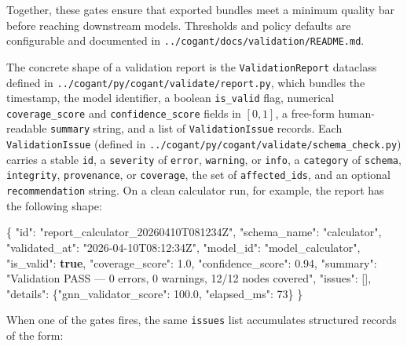 \documentclass[
]{article}
\newenvironment{Shaded}{}{}
\newcommand{\DataTypeTok}[1]{\textcolor[rgb]{0.56,0.13,0.00}{#1}}
\newcommand{\DecValTok}[1]{\textcolor[rgb]{0.25,0.63,0.44}{#1}}
\newcommand{\FloatTok}[1]{\textcolor[rgb]{0.25,0.63,0.44}{#1}}
\newcommand{\FunctionTok}[1]{\textcolor[rgb]{0.02,0.16,0.49}{#1}}
\newcommand{\KeywordTok}[1]{\textcolor[rgb]{0.00,0.44,0.13}{\textbf{#1}}}
\newcommand{\OtherTok}[1]{\textcolor[rgb]{0.00,0.44,0.13}{#1}}
\newcommand{\StringTok}[1]{\textcolor[rgb]{0.25,0.44,0.63}{#1}}
\begin{document}
Together, these gates ensure that exported bundles meet a minimum
quality bar before reaching downstream models. Thresholds and policy
defaults are configurable and documented in
\texttt{../cogant/docs/validation/README.md}.

The concrete shape of a validation report is the
\texttt{ValidationReport} dataclass defined in
\texttt{../cogant/py/cogant/validate/report.py}, which bundles the
timestamp, the model identifier, a boolean \texttt{is\_valid} flag,
numerical \texttt{coverage\_score} and \texttt{confidence\_score} fields
in \([0, 1]\), a free-form human-readable \texttt{summary} string, and a
list of \texttt{ValidationIssue} records. Each \texttt{ValidationIssue}
(defined in \texttt{../cogant/py/cogant/validate/schema\_check.py})
carries a stable \texttt{id}, a \texttt{severity} of \texttt{error},
\texttt{warning}, or \texttt{info}, a \texttt{category} of
\texttt{schema}, \texttt{integrity}, \texttt{provenance}, or
\texttt{coverage}, the set of \texttt{affected\_ids}, and an optional
\texttt{recommendation} string. On a clean calculator run, for example,
the report has the following shape:

\begin{Shaded}
\begin{Highlighting}[]
\FunctionTok{\{}
  \DataTypeTok{"id"}\FunctionTok{:} \StringTok{"report\_calculator\_20260410T081234Z"}\FunctionTok{,}
  \DataTypeTok{"schema\_name"}\FunctionTok{:} \StringTok{"calculator"}\FunctionTok{,}
  \DataTypeTok{"validated\_at"}\FunctionTok{:} \StringTok{"2026{-}04{-}10T08:12:34Z"}\FunctionTok{,}
  \DataTypeTok{"model\_id"}\FunctionTok{:} \StringTok{"model\_calculator"}\FunctionTok{,}
  \DataTypeTok{"is\_valid"}\FunctionTok{:} \KeywordTok{true}\FunctionTok{,}
  \DataTypeTok{"coverage\_score"}\FunctionTok{:} \FloatTok{1.0}\FunctionTok{,}
  \DataTypeTok{"confidence\_score"}\FunctionTok{:} \FloatTok{0.94}\FunctionTok{,}
  \DataTypeTok{"summary"}\FunctionTok{:} \StringTok{"Validation PASS — 0 errors, 0 warnings, 12/12 nodes covered"}\FunctionTok{,}
  \DataTypeTok{"issues"}\FunctionTok{:} \OtherTok{[]}\FunctionTok{,}
  \DataTypeTok{"details"}\FunctionTok{:} \FunctionTok{\{}\DataTypeTok{"gnn\_validator\_score"}\FunctionTok{:} \FloatTok{100.0}\FunctionTok{,} \DataTypeTok{"elapsed\_ms"}\FunctionTok{:} \DecValTok{73}\FunctionTok{\}}
\FunctionTok{\}}
\end{Highlighting}
\end{Shaded}

When one of the gates fires, the same \texttt{issues} list accumulates
structured records of the form:
\end{document}
